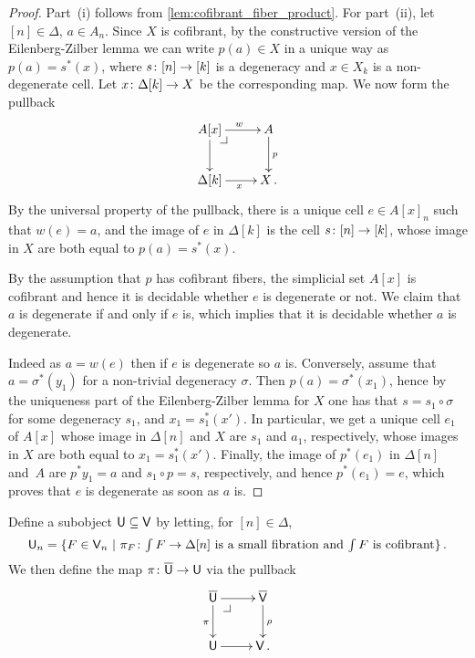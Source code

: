 \documentclass[reqno,10pt,a4paper,oneside,draft]{amsart}
\begin{document}
\begin{proof} Part~(i) follows from \cref{lem:cofibrant_fiber_product}. For part~(ii), let $[n] \in \Delta$, $a \in A_n$. Since $X$ is cofibrant, by the constructive version of the Eilenberg-Zilber lemma we can write $p(a) \in X$ in a unique way as $p(a) =s^*(x)$, where $s \colon [n] \to [k]$ is a degeneracy and 
$x \in X_k$ is a non-degenerate cell. Let $x \colon \Delta[k] \rightarrow X$ be the corresponding map. We now form the pullback
\[
\xymatrix{
A[x] \ar[r]^w \ar[d] \drpullback & A  \ar[d]^{p}  \\
\Delta[k] \ar[r]_{x} & X \, . }
\]
By the universal property of the pullback, there is a unique cell $e \in A[x]_n$ such that $w(e)=a$, and the image of $e$ in $\Delta[k]$ is the cell $s \colon [n] \to [k]$, whose image in $X$ are both equal to $p(a)=s^*(x)$.

By the assumption that $p$ has cofibrant fibers, the simplicial set $A[x]$ is cofibrant and hence it is decidable whether $e$ is degenerate or not. We claim that $a$ is degenerate if and only if $e$ is, which implies that it is decidable whether $a$ is degenerate.

 Indeed as $a = w(e)$ then if $e$ is degenerate so $a$ is. Conversely, assume that $a=\sigma^*(y_1)$ for a non-trivial degeneracy $\sigma$. Then $p(a)=\sigma^*(x_1)$, hence by the uniqueness part of the Eilenberg-Zilber lemma for $X$ one has that $s=s_1 \circ \sigma$ for some degeneracy $s_1$, and $x_1 = s_1^*(x')$. In particular, we get a unique cell $e_1$ of $A[x]$ whose image in $\Delta[n]$ and $X$ are  $s_1$ and $a_1$, respectively, whose images in $X$ are both equal to $x_1=s_1^*(x')$. Finally, the image of $p^*(e_1)$ in $\Delta[n]$ and~$A$ are  $p^* y_1 =a$ and $s_1 \circ p =s$, respectively, and hence $p^*(e_1) =e$, which proves that $e$ is degenerate as soon as $a$ is.
\end{proof} 


Define a subobject $\mathsf{U} \subseteq \mathsf{V}$ by letting, for $[n] \in \Delta$, 
\[
\mathsf{U}_n = \{ F \in \mathsf{V}_n \ | \ \pi_F \colon \textstyle{\int F} \to \Delta[n] \text{ is a small fibration and 
$ \textstyle{\int F}$ is cofibrant} \} \, .
\]
We then define the map $\pi \colon \overline{\mathsf{U}} \to \mathsf{U}$ via the pullback 
\begin{equation}
\label{equ:def-of-pi}
\begin{gathered}
\xymatrix{
\UU \ar[r] \ar[d]_\pi \drpullback  & \VV \ar[d]^\rho \\
\U \ar[r] & \V \, . }
\end{gathered}
\end{equation}
\end{document}
